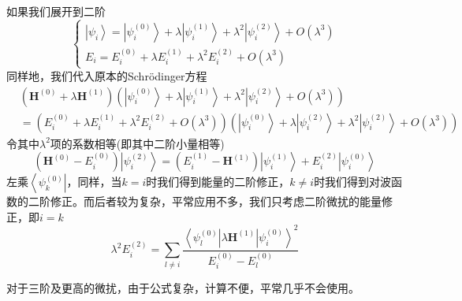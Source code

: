 \documentclass[12pt,a4paper,openany,twoside]{book}
\numberwithin{equation}{section}
\newcommand{\sch}{Schr\"odinger}
\begin{document}
            如果我们展开到二阶
            \begin{equation}
              \left\{\begin{array}{l}{\left|\psi_{i}\right\rangle=\left|\psi_{i}^{(0)}\right\rangle+\lambda\left|\psi_{i}^{(1)}\right\rangle+\lambda^{2}\left|\psi_{i}^{(2)}\right\rangle+ O\left(\lambda^{3}\right)} \\ {E_{i}=E_{i}^{(0)}+\lambda E_{i}^{(1)}+\lambda^{2} E_{i}^{(2)}+O\left(\lambda^{3}\right)}\end{array}\right.
            \end{equation}
            同样地，我们代入原本的\sch 方程
            \begin{equation}
              \begin{aligned}
                &\left(\mathbf{H}^{(0)}+\lambda \mathbf{H}^{(1)}\right)\left(\left|\psi_{i}^{(0)}\right\rangle+\lambda\left|\psi_{i}^{(1)}\right\rangle+\lambda^{2}\left|\psi_{i}^{(2)}\right\rangle+ O\left(\lambda^{3}\right)\right)\\&=\left(E_{i}^{(0)}+\lambda E_{i}^{(1)}+\lambda^{2} E_{i}^{(2)}+O\left(\lambda^{3}\right)\right)\left(\left|\psi_{i}^{(0)}\right\rangle+\lambda\left|\psi_{i}^{(2)}\right\rangle+\lambda^{2}\left|\psi_{i}^{(2)}\right\rangle+ O\left(\lambda^{3}\right)\right)
              \end{aligned}
            \end{equation}
            令其中$\lambda^2$项的系数相等(即其中二阶小量相等)
            \begin{equation}
              \left(\mathbf{H}^{(0)}-E_{i}^{(0)}\right)\left|\psi_{i}^{(2)}\right\rangle=\left(E_{i}^{(1)}-\mathbf{H}^{(1)}\right)\left|\psi_{i}^{(1)}\right\rangle+ E_{i}^{(2)}\left|\psi_{i}^{(0)}\right\rangle
            \end{equation}
            左乘$\left\langle\psi_k^{(0)}\right|$，同样，当$k=i$时我们得到能量的二阶修正，$k\neq i$时我们得到对波函数的二阶修正。而后者较为复杂，平常应用不多，我们只考虑二阶微扰的能量修正，即$i=k$
            \begin{equation}
              \lambda^2E_{i}^{(2)}=\sum_{l \neq i} \frac{\left\langle\psi_{l}^{(0)}\left|\lambda\mathbf{H}^{(1)}\right| \psi_{i}^{(0)}\right\rangle^{2}}{E_{i}^{(0)}-E_{l}^{(0)}}
            \end{equation}

            对于三阶及更高的微扰，由于公式复杂，计算不便，平常几乎不会使用。
          
\end{document}
